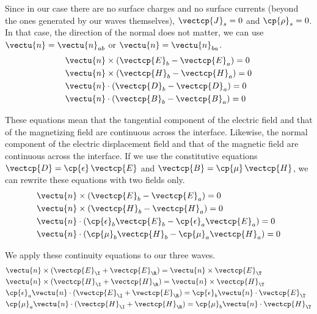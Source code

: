 \begin{refsection}
Since in our case there are no surface charges and no surface currents (beyond the ones generated by our waves themselves), $\vectcp{J}_s=0$ and $\cp{\rho}_s=0$.
In that case, the direction of the normal does not matter, we can use $\vectu{n}=\vectu{n}_{ab}$ or $\vectu{n}=\vectu{n}_{ba}$.
\begin{align}
    &\vectu{n} \times (\vectcp{E}_b - \vectcp{E}_a) = 0 \\
    &\vectu{n} \times (\vectcp{H}_b - \vectcp{H}_a) = 0 \\
    &\vectu{n} \cdot  (\vectcp{D}_b - \vectcp{D}_a) = 0 \\
    &\vectu{n} \cdot  (\vectcp{B}_b - \vectcp{B}_a) = 0
\end{align}

These equations mean that the tangential component of the electric field and that of the magnetizing field are continuous across the interface.
Likewise, the normal component of the electric displacement field and that of the magnetic field are continuous across the interface.
If we use the constitutive equations $\vectcp{D}=\cp{\epsilon} \, \vectcp{E}$ and $\vectcp{B}=\cp{\mu} \, \vectcp{H}$, we can rewrite these equations with two fields only.
\begin{align}
    &\vectu{n} \times (\vectcp{E}_b - \vectcp{E}_a) = 0 \\
    &\vectu{n} \times (\vectcp{H}_b - \vectcp{H}_a) = 0 \\
    &\vectu{n} \cdot  (\cp{\epsilon}_b \vectcp{E}_b - \cp{\epsilon}_a \vectcp{E}_a) = 0 \\
    &\vectu{n} \cdot  (\cp{\mu}_b      \vectcp{H}_b - \cp{\mu}_a      \vectcp{H}_a) = 0
\end{align}

We apply these continuity equations to our three waves.
\begin{align}
    &\vectu{n} \times (\vectcp{E}_\I + \vectcp{E}_\R) = \vectu{n} \times \vectcp{E}_\T \\
    &\vectu{n} \times (\vectcp{H}_\I + \vectcp{H}_\R) = \vectu{n} \times \vectcp{H}_\T \\
    &\cp{\epsilon}_a \vectu{n} \cdot (\vectcp{E}_\I + \vectcp{E}_\R) =
     \cp{\epsilon}_b \vectu{n} \cdot \vectcp{E}_\T \\
    &\cp{\mu}_a \vectu{n} \cdot (\vectcp{H}_\I + \vectcp{H}_\R) =
     \cp{\mu}_b \vectu{n} \cdot \vectcp{H}_\T
\end{align}




\end{refsection}
